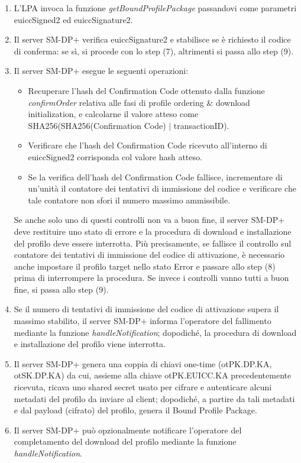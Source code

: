 \documentclass[10pt, oneside]{book}
\begin{document}
\begin{enumerate}
\item L'LPA invoca la funzione \textit{getBoundProfilePackage} passandovi come parametri euiccSigned2 ed euiccSignature2.
\item Il server SM-DP+ verifica euiccSignature2 e stabilisce se è richiesto il codice di conferma: se sì, si procede con lo step (7), altrimenti si passa allo step (9).
\item Il server SM-DP+ esegue le seguenti operazioni:
\begin{itemize}[itemsep=0pt]
\item Recuperare l'hash del Confirmation Code ottenuto dalla funzione \textit{confirmOrder} relativa alle fasi di profile ordering \& download initialization, e calcolarne il valore atteso come SHA256(SHA256(Confirmation Code) $\vert$ transactionID).
\item Verificare che l'hash del Confirmation Code ricevuto all'interno di euiccSigned2 corrisponda col valore hash atteso.
\item Se la verifica dell'hash del Confirmation Code fallisce, incrementare di un'unità il contatore dei tentativi di immissione del codice e verificare che tale contatore non sfori il numero massimo ammissibile.
\end{itemize}
Se anche solo uno di questi controlli non va a buon fine, il server SM-DP+ deve restituire uno stato di errore e la procedura di download e installazione del profilo deve essere interrotta. Più precisamente, se fallisce il controllo sul contatore dei tentativi di immissione del codice di attivazione, è necessario anche impostare il profilo target nello stato Error e passare allo step (8) prima di interrompere la procedura. Se invece i controlli vanno tutti a buon fine, si passa allo step (9).
\item Se il numero di tentativi di immissione del codice di attivazione supera il massimo stabilito, il server SM-DP+ informa l'operatore del fallimento mediante la funzione \textit{handleNotification}; dopodiché, la procedura di download e installazione del profilo viene interrotta.
\item Il server SM-DP+ genera una coppia di chiavi one-time (otPK.DP.KA, otSK.DP.KA) da cui, assieme alla chiave otPK.EUICC.KA precedentemente ricevuta, ricava uno shared secret usato per cifrare e autenticare alcuni metadati del profilo da inviare al client; dopodiché, a partire da tali metadati e dal payload (cifrato) del profilo, genera il Bound Profile Package.
\item Il server SM-DP+ può opzionalmente notificare l'operatore del completamento del download del profilo mediante la funzione \textit{handleNotification}.

\end{enumerate}
\end{document}
